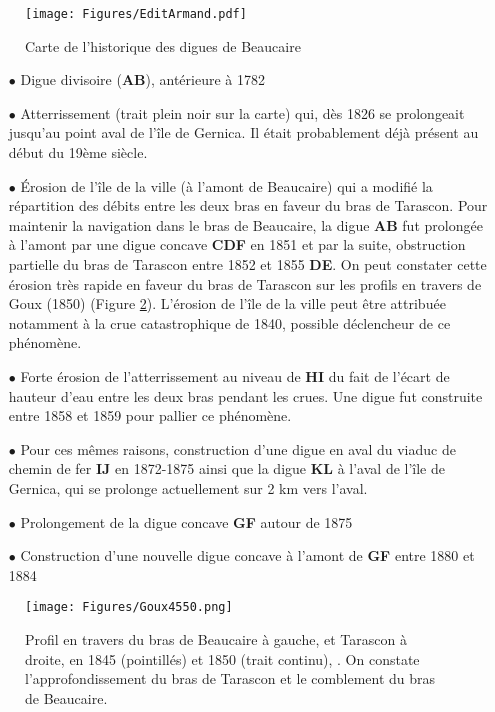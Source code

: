 \documentclass[11pt]{article}
\begin{document}
         \begin{figure}[h]
            \centering
            \texttt{[image: Figures/EditArmand.pdf]}
            \caption{Carte de l'historique des digues de Beaucaire \citep{armand_ii_1907}}
            \label{fig:DigArmand}
        \end{figure}
        
        \begin{itemize}
            \item[$\bullet$] Digue divisoire (\textbf{AB}), antérieure à 1782
            \item[$\bullet$] Atterrissement (trait plein noir sur la carte) qui, dès 1826 se prolongeait jusqu'au point aval de l'île de Gernica. Il était probablement déjà présent au début du 19ème siècle.
            \item[$\bullet$] Érosion de l'île de la ville (à l'amont de Beaucaire) qui a modifié la répartition des débits entre les deux bras en faveur du bras de Tarascon. Pour maintenir la navigation dans le bras de Beaucaire, la digue \textbf{AB} fut prolongée à l'amont par une digue concave \textbf{CDF} en 1851 et par la suite, obstruction partielle du bras de Tarascon entre 1852 et 1855 \textbf{DE}. On peut constater cette érosion très rapide en faveur du bras de Tarascon sur les profils en travers de Goux (1850) (Figure \ref{fig:ProfGoux}). L'érosion de l'île de la ville peut être attribuée notamment à la crue catastrophique de 1840, possible déclencheur de ce phénomène.
            \item[$\bullet$] Forte érosion de l'atterrissement au niveau de \textbf{HI} du fait de l'écart de hauteur d'eau entre les deux bras pendant les crues. Une digue fut construite entre 1858 et 1859 pour pallier ce phénomène.
            \item[$\bullet$] Pour ces mêmes raisons, construction d'une digue en aval du viaduc de chemin de fer \textbf{IJ} en 1872-1875 ainsi que la digue \textbf{KL} à l'aval de l'île de Gernica, qui se prolonge actuellement sur 2 km vers l'aval.
            \item[$\bullet$] Prolongement de la digue concave \textbf{GF} autour de 1875
            \item[$\bullet$] Construction d'une nouvelle digue concave à l'amont de \textbf{GF} entre 1880 et 1884
        \end{itemize}

     
        
        \begin{figure}[h]
            \centering
            \texttt{[image: Figures/Goux4550.png]}
            \caption{Profil en travers du bras de Beaucaire à gauche, et Tarascon à droite, en 1845 (pointillés) et 1850 (trait continu), \citet{goux_modification_1851}. On constate l'approfondissement du bras de Tarascon et le comblement du bras de Beaucaire.}
            \label{fig:ProfGoux}
        \end{figure}
            
\end{document}

